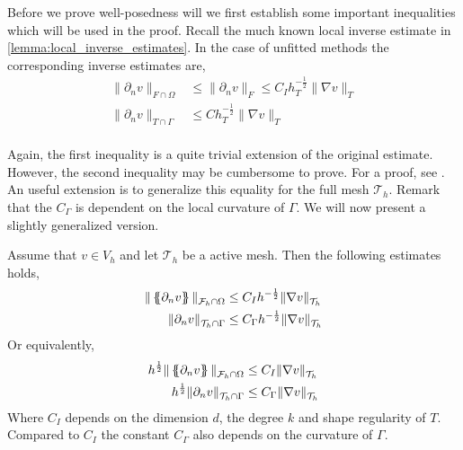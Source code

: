 Before we prove well-posedness will we first establish some important inequalities which will be used in the proof.
Recall the much known local inverse estimate in \ref{lemma:local_inverse_estimates}. In the case of unfitted methods the corresponding inverse estimates are,
\begin{equation}
\label{eq:unfitted_localinv}
\begin{split}
    \| \partial _{n} v \|_{ F\cap \Omega  }^{  } & \le \| \partial _{n}  v \|_{F  }^{  } \le  C_{I} h_{T} ^{-\frac{1}{2}} \| \nabla v \|_{ T }^{  } \\
    \| \partial _{n} v \|_{ T\cap \Gamma   }^{  } &  \le  C h_{T} ^{-\frac{1}{2}} \| \nabla v \|_{ T }^{  } \\
\end{split}
\end{equation}


Again, the first inequality is a quite trivial extension of the original estimate. However, the second inequality may be cumbersome to prove. For a proof, see \cite{hansbo2003finite}.
An useful extension is to generalize this equality for the full mesh $\mathcal{T} _{h}$.
Remark that the $C_{\Gamma } $ is dependent on the local curvature of $\Gamma $. 
We will now present a slightly generalized version.
\begin{corollary}
    \label{cor:unfitted_inverse_estimates}
    Assume that $v \in V_{h} $ and let $\mathcal{T}_{h} $ be a active mesh. Then the following estimates holds,
    \[
\begin{split}
    \| \left\{\!\!\left\{ \partial _{n} v \right\}\!\!\right\}   \|_{ \mathcal{F}_h \cap \Omega  }^{  } & \le   C_{I} h ^{-\frac{1}{2}} \| \nabla v \|_{ \mathcal{T}_{h}  }^{  } \\
    \| \partial _{n} v \|_{ \mathcal{T}_{h} \cap \Gamma   }^{  } &  \le  C_{\Gamma } h ^{-\frac{1}{2}} \| \nabla v \|_{ \mathcal{T} _{h} }^{  } \\
\end{split}
    \]
    Or equivalently,
    \[
\begin{split}
    h^{\frac{1}{2}}\| \left\{\!\!\left\{ \partial _{n} v \right\}\!\!\right\} \|_{ \mathcal{F}_h \cap \Omega  }^{  } & \le  C_{I}  \| \nabla v \|_{ \mathcal{T}_{h}  }^{  } \\
    h^{\frac{1}{2}}\| \partial _{n} v \|_{ \mathcal{T}_{h} \cap \Gamma   }^{  } &  \le  C_{\Gamma }  \| \nabla v \|_{ \mathcal{T} _{h} }^{  } \\
\end{split}
    \]
Where $C_{I}$ depends on the dimension $d$, the degree $k$ and shape regularity of $T$. Compared to $C_{I}$ the constant $C_{\Gamma }$ also depends on the curvature of $\Gamma $.
\end{corollary}



